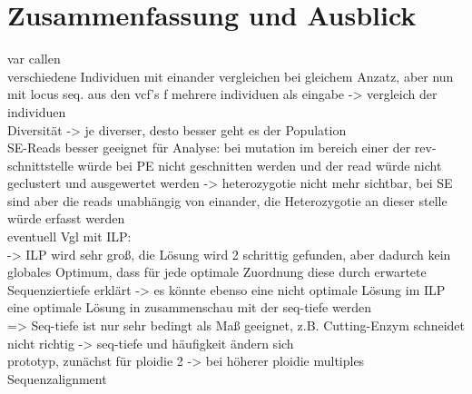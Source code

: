 \chapter{Zusammenfassung und Ausblick} \label{sec:ausblick}
var callen\\
verschiedene Individuen mit einander vergleichen bei gleichem Anzatz, aber nun mit locus seq. aus den vcf's f mehrere individuen als eingabe -> vergleich der individuen \\
Diversität -> je diverser, desto besser geht es der Population\\
SE-Reads besser geeignet für Analyse: bei mutation im bereich einer der rev-schnittstelle  würde bei PE nicht geschnitten werden und der read würde nicht geclustert und ausgewertet werden -> heterozygotie nicht mehr sichtbar, bei SE sind aber die reads unabhängig von einander, die Heterozygotie an dieser stelle würde erfasst werden\\
eventuell Vgl mit ILP:\\
-> ILP wird sehr groß, die Lösung wird 2 schrittig gefunden, aber dadurch kein globales Optimum, dass für jede optimale Zuordnung diese durch erwartete Sequenziertiefe erklärt -> es könnte ebenso eine nicht optimale Lösung im ILP eine optimale Lösung in zusammenschau mit der seq-tiefe werden \\
=> Seq-tiefe ist nur sehr bedingt als Maß geeignet, z.B. Cutting-Enzym schneidet nicht richtig -> seq-tiefe und häufigkeit ändern sich\\

prototyp, zunächst für ploidie 2 -> bei höherer ploidie multiples Sequenzalignment ~\cite{liu_2010} ~\cite{durbin_1998}

\section{} \label{sec:}
\subsection{} \label{subsec:}